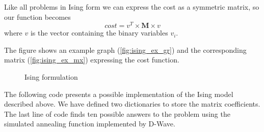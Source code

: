 Like all problems in Ising form we can express the cost as a symmetric matrix, so our function becomes
\[
cost = v^T \times \mathbf{M} \times v
\]
where $v$ is the vector containing the binary variables $v_i$.

The figure shows an example graph (\ref{fig:ising_ex_gr}) and the corresponding matrix (\ref{fig:ising_ex_mx}) expressing the cost function.

\begin{figure}[h]
	\centering
	 \qquad
	\caption{Ising formulation}
	\label{fig:ising_ex}
\end{figure}

The following code presents a possible implementation of the Ising model described above. We have defined two dictionaries to store the matrix coefficients. The last line of code finds ten possible answers to the problem using the simulated annealing function implemented by D-Wave.
\begin{listing}[H]
	\caption{Ising example}
	\label{lst:ising_ex}
\end{listing}

